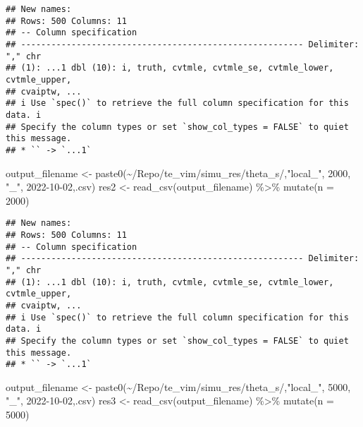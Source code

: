 \documentclass[
]{article}
\newenvironment{Shaded}{\begin{snugshade}}{\end{snugshade}}
\newcommand{\AttributeTok}[1]{\textcolor[rgb]{0.77,0.63,0.00}{#1}}
\newcommand{\DecValTok}[1]{\textcolor[rgb]{0.00,0.00,0.81}{#1}}
\newcommand{\FunctionTok}[1]{\textcolor[rgb]{0.00,0.00,0.00}{#1}}
\newcommand{\NormalTok}[1]{#1}
\newcommand{\OtherTok}[1]{\textcolor[rgb]{0.56,0.35,0.01}{#1}}
\newcommand{\SpecialCharTok}[1]{\textcolor[rgb]{0.00,0.00,0.00}{#1}}
\newcommand{\StringTok}[1]{\textcolor[rgb]{0.31,0.60,0.02}{#1}}
\begin{document}
\begin{verbatim}
## New names:
## Rows: 500 Columns: 11
## -- Column specification
## -------------------------------------------------------- Delimiter: "," chr
## (1): ...1 dbl (10): i, truth, cvtmle, cvtmle_se, cvtmle_lower, cvtmle_upper,
## cvaiptw, ...
## i Use `spec()` to retrieve the full column specification for this data. i
## Specify the column types or set `show_col_types = FALSE` to quiet this message.
## * `` -> `...1`
\end{verbatim}

\begin{Shaded}
\begin{Highlighting}[]
\NormalTok{output\_filename }\OtherTok{\textless{}{-}} \FunctionTok{paste0}\NormalTok{(}\StringTok{\textquotesingle{}\textasciitilde{}/Repo/te\_vim/simu\_res/theta\_s/\textquotesingle{}}\NormalTok{,}\StringTok{"local\_"}\NormalTok{, }\DecValTok{2000}\NormalTok{, }\StringTok{"\_"}\NormalTok{, }\StringTok{\textquotesingle{}2022{-}10{-}02\textquotesingle{}}\NormalTok{,}\StringTok{\textquotesingle{}.csv\textquotesingle{}}\NormalTok{)}
\NormalTok{res2 }\OtherTok{\textless{}{-}} \FunctionTok{read\_csv}\NormalTok{(output\_filename) }\SpecialCharTok{\%\textgreater{}\%} \FunctionTok{mutate}\NormalTok{(}\AttributeTok{n =} \DecValTok{2000}\NormalTok{)}
\end{Highlighting}
\end{Shaded}

\begin{verbatim}
## New names:
## Rows: 500 Columns: 11
## -- Column specification
## -------------------------------------------------------- Delimiter: "," chr
## (1): ...1 dbl (10): i, truth, cvtmle, cvtmle_se, cvtmle_lower, cvtmle_upper,
## cvaiptw, ...
## i Use `spec()` to retrieve the full column specification for this data. i
## Specify the column types or set `show_col_types = FALSE` to quiet this message.
## * `` -> `...1`
\end{verbatim}

\begin{Shaded}
\begin{Highlighting}[]
\NormalTok{output\_filename }\OtherTok{\textless{}{-}} \FunctionTok{paste0}\NormalTok{(}\StringTok{\textquotesingle{}\textasciitilde{}/Repo/te\_vim/simu\_res/theta\_s/\textquotesingle{}}\NormalTok{,}\StringTok{"local\_"}\NormalTok{, }\DecValTok{5000}\NormalTok{, }\StringTok{"\_"}\NormalTok{, }\StringTok{\textquotesingle{}2022{-}10{-}02\textquotesingle{}}\NormalTok{,}\StringTok{\textquotesingle{}.csv\textquotesingle{}}\NormalTok{)}
\NormalTok{res3 }\OtherTok{\textless{}{-}} \FunctionTok{read\_csv}\NormalTok{(output\_filename) }\SpecialCharTok{\%\textgreater{}\%} \FunctionTok{mutate}\NormalTok{(}\AttributeTok{n =} \DecValTok{5000}\NormalTok{)}
\end{Highlighting}
\end{Shaded}
\end{document}
